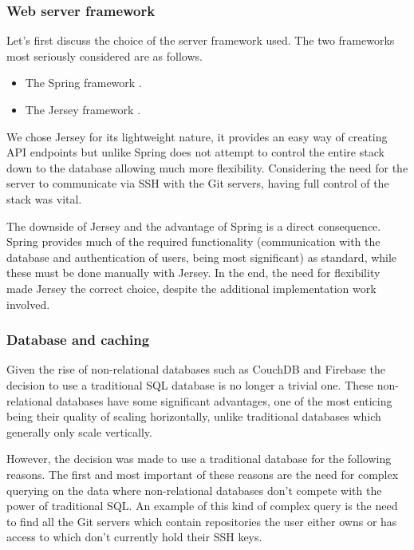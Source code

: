 \subsubsection{Web server framework}

Let's first discuss the choice of the server framework used. The two frameworks most seriously considered are as follows.

\begin{itemize}
\item The Spring framework \cite{spring}.
\item The Jersey framework \cite{jersey}.
\end{itemize}

We chose Jersey for its lightweight nature, it provides an easy way of creating API endpoints but unlike Spring does not attempt to control the entire stack down to the database allowing much more flexibility. Considering the need for the server to communicate via SSH with the Git servers, having full control of the stack was vital.

The downside of Jersey and the advantage of Spring is a direct consequence. Spring provides much of the required functionality (communication with the database and authentication of users, being most significant) as standard, while these must be done manually with Jersey. In the end, the need for flexibility made Jersey the correct choice, despite the additional implementation work involved.

\subsubsection{Database and caching}

Given the rise of non-relational databases such as CouchDB and Firebase the decision to use a traditional SQL database is no longer a trivial one. These non-relational databases have some significant advantages, one of the most enticing being their quality of scaling horizontally, unlike traditional databases which generally only scale vertically. 

However, the decision was made to use a traditional database for the following reasons. The first and most important of these reasons are the need for complex querying on the data where non-relational databases don't compete with the power of traditional SQL. An example of this kind of complex query is the need to find all the Git servers which contain repositories the user either owns or has access to which don't currently hold their SSH keys.

